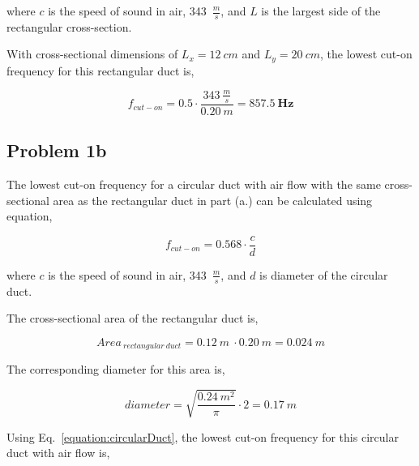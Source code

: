 where $c$ is the speed of sound in air, 343~$\frac{m}{s}$,  and $L$ is the largest side of the rectangular cross-section.

\vspace{0.25cm}
With cross-sectional dimensions of $L_x = 12~cm$ and $L_y = 20~cm$, the lowest cut-on frequency for this rectangular duct is,

\vspace{-0.25cm}
\begin{equation*}
    f_{cut-on} = 0.5 \cdot \frac{ 343~\frac{m}{s} }{ 0.20~m } = \boldsymbol{857.5~Hz}
\end{equation*}



\vspace{-0.25cm}
\subsection*{Problem 1b}

The lowest cut-on frequency for a circular duct with air flow with the same cross-sectional area as the rectangular duct in part (a.) can be calculated using equation,

\vspace{-0.25cm}
\begin{equation}
    f_{cut-on} = 0.568 \cdot \frac{c}{d}
    \label{equation:circularDuct}
\end{equation}

where $c$ is the speed of sound in air, 343~$\frac{m}{s}$,  and $d$ is diameter of the circular duct.

\vspace{0.25cm}
The cross-sectional area of the rectangular duct is,

\vspace{-0.25cm}
\begin{equation*}
    Area_{~rectangular~duct} = 0.12~m~\cdot0.20~m =  0.024~m
\end{equation*}

\vspace{0.25cm}
The corresponding diameter for this area is,

\vspace{-0.25cm}
\begin{equation*}
    diameter = \sqrt{ \frac{0.24~m^2}{\pi} } \cdot 2 = 0.17~m
\end{equation*}

\vspace{0.25cm}
Using Eq.~\ref{equation:circularDuct}, the lowest cut-on frequency for this circular duct with air flow is,


